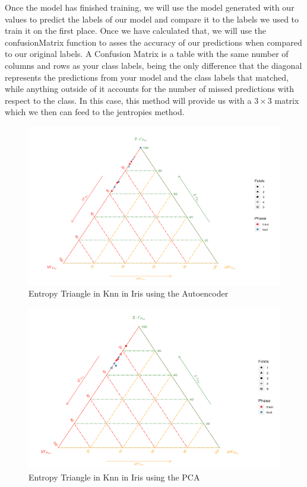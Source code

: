 \documentclass[12pt]{report}
\begin{document}
Once the model has finished training, we will use the model generated with our values to predict the labels of our model and compare it to the labels we used to train it on the first place. Once we have calculated that, we will use the confusionMatrix function to asses the accuracy of our predictions when compared to our original labels. A Confusion Matrix is a table with the same number of columns and rows as your class labels, being the only difference that the diagonal represents the predictions from your model and the class labels that matched, while anything outside of it accounts for the number of missed predictions with respect to the class. In this case, this method will provide us with a $3\times3$ matrix which we then can feed to the jentropies method. \par


\begin{figure}[H]
	\centering
	\includegraphics[width=1.2\linewidth]{Figuras_tfg/ET_knn_iris_auto}
	\caption{Entropy Triangle in Knn in Iris using the Autoencoder}
	\label{fig:figure_Knn_Iris_ET_Auto}
\end{figure}

\begin{figure}[H]
	\centering
	\includegraphics[width=1.2\linewidth]{Figuras_tfg/ET_knn_iris_pca}
	\caption{Entropy Triangle in Knn in Iris using the PCA}
	\label{fig:figure_Knn_Iris_ET_PCA}
\end{figure}
\end{document}
